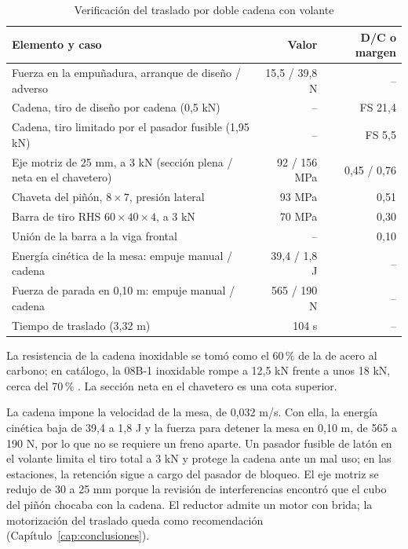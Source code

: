 \begin{table}[htbp]
\centering\small\singlespacing
\caption{Verificación del traslado por doble cadena con volante}
\label{tab:traslado-verificacion}
\begin{tabularx}{\textwidth}{@{}Yrr@{}}
\toprule
\textbf{Elemento y caso} & \textbf{Valor} & \textbf{D/C o margen}\\
\midrule
Fuerza en la empuñadura, arranque de diseño / adverso & 15,5 / 39,8 N & --\\
Cadena, tiro de diseño por cadena (0,5 kN) & -- & FS 21,4\\
Cadena, tiro limitado por el pasador fusible (1,95 kN) & -- & FS 5,5\\
Eje motriz de 25 mm, a 3 kN (sección plena / neta en el chavetero) & 92 / 156 MPa & 0,45 / 0,76\\
Chaveta del piñón, $8\times7$, presión lateral & 93 MPa & 0,51\\
Barra de tiro RHS $60\times40\times4$, a 3 kN & 70 MPa & 0,30\\
Unión de la barra a la viga frontal & -- & 0,10\\
Energía cinética de la mesa: empuje manual / cadena & 39,4 / 1,8 J & --\\
Fuerza de parada en 0,10 m: empuje manual / cadena & 565 / 190 N & --\\
Tiempo de traslado (3,32 m) & 104 s & --\\
\bottomrule
\end{tabularx}
\par\smallskip\footnotesize
La resistencia de la cadena inoxidable se tomó como el 60\,\% de la de acero al carbono; en catálogo, la 08B-1 inoxidable rompe a 12,5 kN frente a unos 18 kN, cerca del 70\,\% \cite{iwis08b}. La sección neta en el chavetero es una cota superior.
\end{table}

La cadena impone la velocidad de la mesa, de 0,032 m/s. Con ella, la energía cinética baja de 39,4 a 1,8 J y la fuerza para detener la mesa en 0,10 m, de 565 a 190 N, por lo que no se requiere un freno aparte. Un pasador fusible de latón en el volante limita el tiro total a 3 kN y protege la cadena ante un mal uso; en las estaciones, la retención sigue a cargo del pasador de bloqueo. El eje motriz se redujo de 30 a 25 mm porque la revisión de interferencias encontró que el cubo del piñón chocaba con la cadena.
 El reductor admite un motor con brida; la motorización del traslado queda como recomendación (Capítulo~\ref{cap:conclusiones}).

